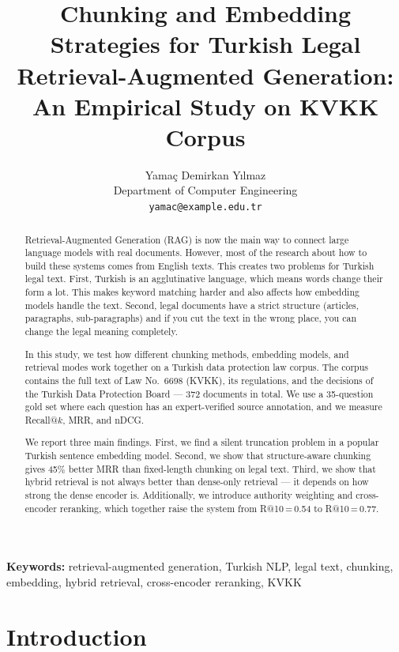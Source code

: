 \documentclass[11pt,a4paper,twocolumn]{article}
\title{Chunking and Embedding Strategies for Turkish Legal\\
Retrieval-Augmented Generation:\\
An Empirical Study on KVKK Corpus}
\author{
  Yamaç Demirkan Yılmaz\\
  Department of Computer Engineering\\
  \texttt{yamac@example.edu.tr}
}
\date{}
\begin{document}
\maketitle

\begin{abstract}
Retrieval-Augmented Generation (RAG) is now the main way to connect large language models with real documents. However, most of the research about how to build these systems comes from English texts. This creates two problems for Turkish legal text. First, Turkish is an agglutinative language, which means words change their form a lot. This makes keyword matching harder and also affects how embedding models handle the text. Second, legal documents have a strict structure (articles, paragraphs, sub-paragraphs) and if you cut the text in the wrong place, you can change the legal meaning completely.

In this study, we test how different chunking methods, embedding models, and retrieval modes work together on a Turkish data protection law corpus. The corpus contains the full text of Law No.~6698 (KVKK), its regulations, and the decisions of the Turkish Data Protection Board --- 372 documents in total. We use a 35-question gold set where each question has an expert-verified source annotation, and we measure Recall@$k$, MRR, and nDCG.

We report three main findings. First, we find a silent truncation problem in a popular Turkish sentence embedding model. Second, we show that structure-aware chunking gives 45\% better MRR than fixed-length chunking on legal text. Third, we show that hybrid retrieval is not always better than dense-only retrieval --- it depends on how strong the dense encoder is. Additionally, we introduce authority weighting and cross-encoder reranking, which together raise the system from R@10\,=\,0.54 to R@10\,=\,0.77.
\end{abstract}

\textbf{Keywords:} retrieval-augmented generation, Turkish NLP, legal text, chunking, embedding, hybrid retrieval, cross-encoder reranking, KVKK

\section{Introduction}
\label{sec:intro}
\end{document}
